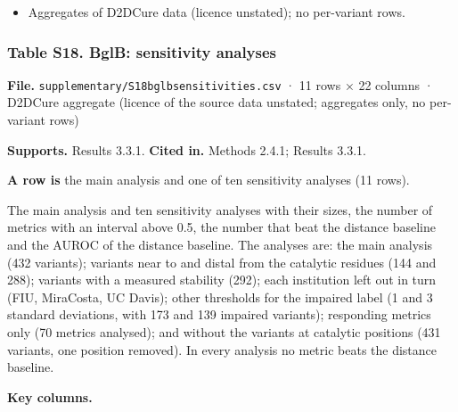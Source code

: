 \documentclass[
  10pt,
]{article}
\providecommand{\tightlist}{%
  \setlength{\itemsep}{0pt}\setlength{\parskip}{0pt}}
\DeclareRobustCommand{\_}{\textunderscore\hspace{0pt}}
\begin{document}
\begin{itemize}
\tightlist
\item
  Aggregates of
  D2DCure data
  (licence
  unstated); no
  per-variant rows.
\end{itemize}

\hypertarget{S18}{%
\subsubsection{Table
S18. BglB:
sensitivity
analyses}\label{S18}}

\begin{shaded}\small

\textbf{File.}
\texttt{supplementary/S18\_bglb\_sensitivities.csv}
· 11 rows × 22
columns · D2DCure
aggregate (licence
of the source data
unstated; aggregates
only, no per-variant
rows)

\textbf{Supports.}
Results 3.3.1.
\textbf{Cited in.}
Methods 2.4.1;
Results 3.3.1.

\textbf{A row is}
the main analysis
and one of ten
sensitivity analyses
(11 rows).

\end{shaded}

The main analysis
and ten sensitivity
analyses with their
sizes, the number of
metrics with an
interval above 0.5,
the number that beat
the distance
baseline and the
AUROC of the
distance baseline.
The analyses are:
the main analysis
(432 variants);
variants near to and
distal from the
catalytic residues
(144 and 288);
variants with a
measured stability
(292); each
institution left out
in turn (FIU,
MiraCosta, UC
Davis); other
thresholds for the
impaired label (1
and 3 standard
deviations, with 173
and 139 impaired
variants);
responding metrics
only (70 metrics
analysed); and
without the variants
at catalytic
positions (431
variants, one
position removed).
In every analysis no
metric beats the
distance baseline.

\textbf{Key
columns.}
\end{document}
